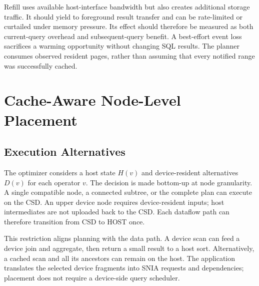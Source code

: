 \documentclass[sigconf, nonacm]{acmart}
\begin{document}
Refill uses available host-interface bandwidth but also creates additional
storage traffic. It should yield to foreground result transfer and can be
rate-limited or curtailed under memory pressure. Its effect should therefore
be measured as both current-query overhead and subsequent-query benefit.
A best-effort event loss sacrifices a warming opportunity without changing
SQL results. The planner consumes observed resident pages, rather than
assuming that every notified range was successfully cached.

\section{Cache-Aware Node-Level Placement}
\label{sec:placement}
\subsection{Execution Alternatives}
The optimizer considers a host state $H(v)$ and device-resident alternatives
$D(v)$ for each operator $v$. The decision is made bottom-up at node
granularity. A single compatible node, a connected subtree, or the complete
plan can execute on the CSD. An upper device node requires device-resident
inputs; host intermediates are not uploaded back to the CSD. Each dataflow
path can therefore transition from CSD to HOST once.

This restriction aligns planning with the data path. A device scan can feed
a device join and aggregate, then return a small result to a host sort.
Alternatively, a cached scan and all its ancestors can remain on the host.
The application translates the selected device fragments into SNIA requests
and dependencies; placement does not require a device-side query scheduler.
\end{document}
